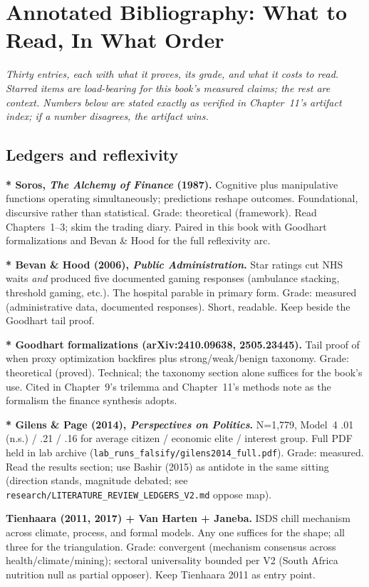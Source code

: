 \chapter{Annotated Bibliography: What to Read, In What Order}
\label{ch:biblio}

\textit{Thirty entries, each with what it proves, its grade, and what it costs to read. Starred items are load-bearing for this book's measured claims; the rest are context. Numbers below are stated exactly as verified in Chapter~11's artifact index; if a number disagrees, the artifact wins.}

\section*{Ledgers and reflexivity}

\textbf{* Soros, \textit{The Alchemy of Finance} (1987).} Cognitive plus manipulative functions operating simultaneously; predictions reshape outcomes. Foundational, discursive rather than statistical. Grade: theoretical (framework). Read Chapters~1--3; skim the trading diary. Paired in this book with Goodhart formalizations and Bevan \& Hood for the full reflexivity arc.

\textbf{* Bevan \& Hood (2006), \textit{Public Administration}.} Star ratings cut NHS waits \textit{and} produced five documented gaming responses (ambulance stacking, threshold gaming, etc.). The hospital parable in primary form. Grade: measured (administrative data, documented responses). Short, readable. Keep beside the Goodhart tail proof.

\textbf{* Goodhart formalizations (arXiv:2410.09638, 2505.23445).} Tail proof of when proxy optimization backfires plus strong/weak/benign taxonomy. Grade: theoretical (proved). Technical; the taxonomy section alone suffices for the book's use. Cited in Chapter~9's trilemma and Chapter~11's methods note as the formalism the finance synthesis adopts.

\textbf{* Gilens \& Page (2014), \textit{Perspectives on Politics}.} N=1,779, Model~4 .01 (n.s.) / .21 / .16 for average citizen / economic elite / interest group. Full PDF held in lab archive (\texttt{lab\_runs\_falsify/gilens2014\_full.pdf}). Grade: measured. Read the results section; use Bashir (2015) as antidote in the same sitting (direction stands, magnitude debated; see \texttt{research/LITERATURE\_REVIEW\_LEDGERS\_V2.md} oppose map).

\textbf{Tienhaara (2011, 2017) + Van Harten + Janeba.} ISDS chill mechanism across climate, process, and formal models. Any one suffices for the shape; all three for the triangulation. Grade: convergent (mechanism consensus across health/climate/mining); sectoral universality bounded per V2 (South Africa nutrition null as partial opposer). Keep Tienhaara 2011 as entry point.

